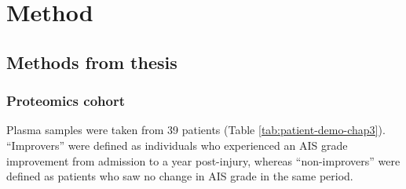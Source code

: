 \documentclass[
]{article}
\begin{document}
\hypertarget{method}{%
\section{Method}\label{method}}

\hypertarget{methods-from-thesis}{%
\subsection{Methods from thesis}\label{methods-from-thesis}}

\hypertarget{itraq-patient-demo}{%
\subsubsection{Proteomics cohort}\label{itraq-patient-demo}}

Plasma samples were taken from 39 patients (Table \ref{tab:patient-demo-chap3}).
``Improvers'' were defined as individuals who experienced an AIS grade improvement from admission to a year post-injury, whereas ``non-improvers'' were defined as patients who saw no change in AIS grade in the same period.
\end{document}
